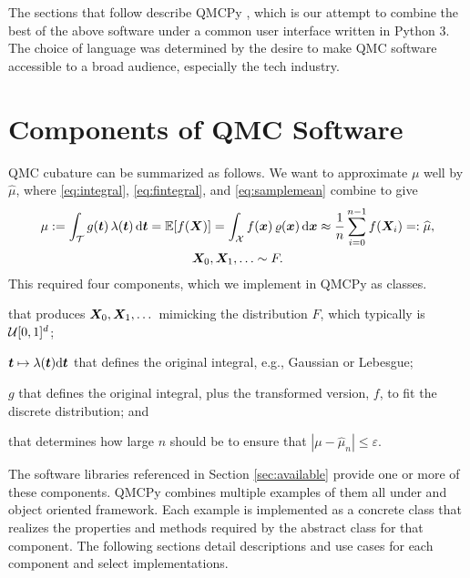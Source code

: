 \documentclass[graybox,footinfo]{svmult}
\newcommand{\QMCPYabs}[1]{\ensuremath{{\left \lvert #1 \right \rvert}}}
\newcommand{\hmu}{\widehat{\mu}}
\begin{document}
The sections that follow describe QMCPy \cite{QMCPy2020a}, which is our attempt to combine the best of the above software under a common user interface written in Python 3.  The choice of language was determined by the desire to make QMC software accessible to a broad audience, especially the tech industry.

\section{Components of QMC Software}
QMC cubature can be summarized as follows.  We want to approximate $\mu$ well by $\hmu$, where \eqref{eq:integral}, \eqref{eq:fintegral}, and \eqref{eq:samplemean} combine to give
\begin{multline} \label{eq:cubSummary}
	\mu : = \int_\calT g(\bst) \, \lambda(\bst) \, \D \bst  = \bbE[f(\bsX)] = \int_\calX f(\bsx) \, \varrho(\bsx) \, \D \bsx \approx \frac 1n \sum_{i=0}^{n-1} f(\bsX_i) =: \hmu, \\
	 \bsX_0, \bsX_1, \ldots \sim F.
\end{multline}
This required four components, which we implement in QMCPy as classes.

\begin{description}[format=\textup,format=\textbf]
	
	\item[Discrete Distribution] that produces ${\boldsymbol{X}}_0, {\boldsymbol{X}}_1, \dots$ mimicking the distribution $F$, which typically is ${\mathcal{U}}[0,1]^d$;
	
	\item[True Measure] ${\boldsymbol{t}} \mapsto \lambda ({\boldsymbol{t}}) \mathrm{d} {\boldsymbol{t}}$ that defines the original integral, e.g., Gaussian or Lebesgue;
	
	\item[Integrand] $g$ that  defines the original integral, plus the transformed version, $f$, to fit the discrete distribution; and
	
	\item[Stopping Criterion] that determines how large $n$ should be to ensure that $\QMCPYabs{\mu - \hmu_n} \le \varepsilon$.
\end{description}

The software libraries referenced in Section \ref{sec:available} provide one or more of these components. QMCPy combines multiple examples of them all under and object oriented framework. Each example is implemented as a concrete class that realizes the properties and methods required by the abstract class for that component. The following sections detail descriptions and use cases for each component and select implementations. 
\end{document}
